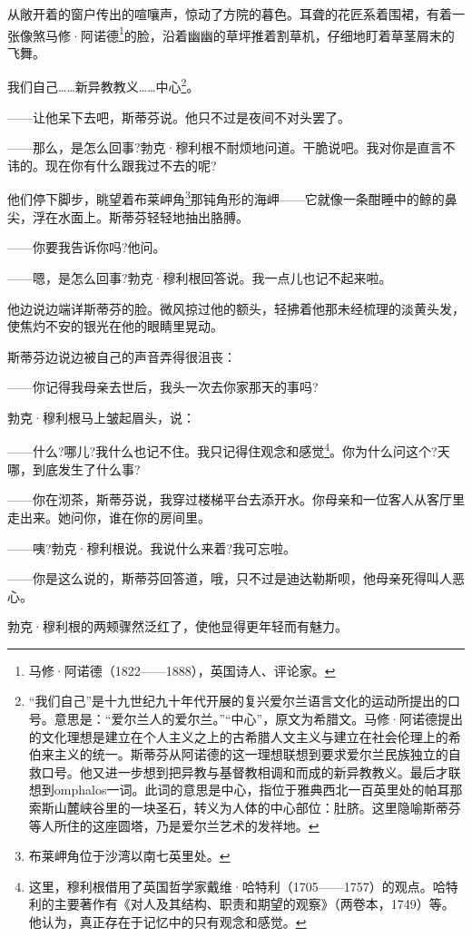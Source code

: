 \par 从敞开着的窗户传出的喧嚷声，惊动了方院的暮色。耳聋的花匠系着围裙，有着一张像煞马修·阿诺德\footnote{马修·阿诺德（1822——1888），英国诗人、评论家。}的脸，沿着幽幽的草坪推着割草机，仔细地盯着草茎屑末的飞舞。
\par 我们自己……新异教教义……中心\footnote{“我们自己”是十九世纪九十年代开展的复兴爱尔兰语言文化的运动所提出的口号。意思是：“爱尔兰人的爱尔兰。”“中心”，原文为希腊文。马修·阿诺德提出的文化理想是建立在个人主义之上的古希腊人文主义与建立在社会伦理上的希伯来主义的统一。斯蒂芬从阿诺德的这一理想联想到要求爱尔兰民族独立的自救口号。他又进一步想到把异教与基督教相调和而成的新异教教义。最后才联想到omphalos一词。此词的意思是中心，指位于雅典西北一百英里处的帕耳那索斯山麓峡谷里的一块圣石，转义为人体的中心部位：肚脐。这里隐喻斯蒂芬等人所住的这座圆塔，乃是爱尔兰艺术的发祥地。}。
\par ——让他呆下去吧，斯蒂芬说。他只不过是夜间不对头罢了。
\par ——那么，是怎么回事?勃克·穆利根不耐烦地问道。干脆说吧。我对你是直言不讳的。现在你有什么跟我过不去的呢?
\par 他们停下脚步，眺望着布莱岬角\footnote{布莱岬角位于沙湾以南七英里处。}那钝角形的海岬——它就像一条酣睡中的鲸的鼻尖，浮在水面上。斯蒂芬轻轻地抽出胳膊。
\par ——你要我告诉你吗?他问。
\par ——嗯，是怎么回事?勃克·穆利根回答说。我一点儿也记不起来啦。
\par 他边说边端详斯蒂芬的脸。微风掠过他的额头，轻拂着他那未经梳理的淡黄头发，使焦灼不安的银光在他的眼睛里晃动。
\par 斯蒂芬边说边被自己的声音弄得很沮丧：
\par ——你记得我母亲去世后，我头一次去你家那天的事吗?
\par 勃克·穆利根马上皱起眉头，说：
\par ——什么?哪儿?我什么也记不住。我只记得住观念和感觉\footnote{这里，穆利根借用了英国哲学家戴维·哈特利（1705——1757）的观点。哈特利的主要著作有《对人及其结构、职责和期望的观察》（两卷本，1749）等。他认为，真正存在于记忆中的只有观念和感觉。}。你为什么问这个?天哪，到底发生了什么事?
\par ——你在沏茶，斯蒂芬说，我穿过楼梯平台去添开水。你母亲和一位客人从客厅里走出来。她问你，谁在你的房间里。
\par ——咦?勃克·穆利根说。我说什么来着?我可忘啦。
\par ——你是这么说的，斯蒂芬回答道，哦，只不过是迪达勒斯呗，他母亲死得叫人恶心。
\par 勃克·穆利根的两颊骤然泛红了，使他显得更年轻而有魅力。
